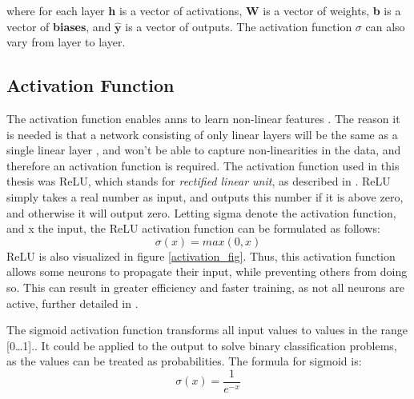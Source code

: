         where for each layer \textbf{h} is a vector of activations, \textbf{W} is a vector of weights, \textbf{b} is a  vector of \textbf{biases}, and $\hat{\textbf{y}}$ is a vector of outputs. The activation function $\sigma$ can also vary from layer to layer.
        
        
    \subsection{Activation Function} \label{activation function}
        The activation function enables \gls{ann}s to learn non-linear features \cite{razavi2021deep_exp_per}. The reason it is needed is that a network consisting of only linear layers will be the same as a single linear layer \cite{razavi2021deep_exp_per}, and won't be able to capture non-linearities in the data, and therefore an activation function is required. The activation function used in this thesis was ReLU, which stands for \textit{rectified linear unit}, as described in \citeauthor{sharma2019new_activation_func}\cite{sharma2019new_activation_func}. ReLU simply takes a real number as input, and outputs this number if it is above zero, and otherwise it will output zero. Letting sigma denote the activation function, and x the input, the ReLU activation function can be formulated as follows:
            \begin{equation} \label{relu_eq}
                \sigma(x) = max(0,x)
            \end{equation}
        ReLU is also visualized in figure \ref{activation_fig}. Thus, this activation function allows some neurons to propagate their input, while preventing others from doing so. This can result in greater efficiency and faster training, as not all neurons are active, further detailed in \citeauthor{sharma2019new_activation_func}\cite{sharma2019new_activation_func}. 
        
        The sigmoid activation function transforms all input values to values in the range [0…1].\cite{sharma2019new_activation_func}. It could be applied to the output to solve binary classification problems, as the values can be treated as probabilities. The formula for sigmoid is:
            \begin{equation} \label{sigmoid_eq}
                \sigma(x) = \dfrac{1}{e^{-x}} 
            \end{equation}
            
